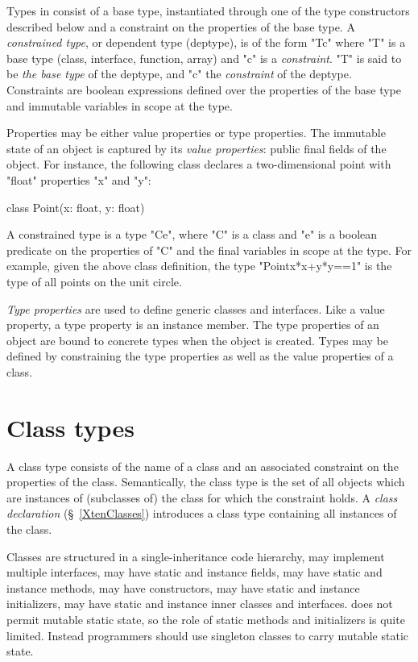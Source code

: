 Types in \Xten{} consist of a base type, instantiated through one of
the type constructors described below and a constraint on the
properties of the base type.
A {\em constrained type}, or dependent type (deptype),
is of the form \xcd"T{c}" where \xcd"T" is a base type (class,
interface, function, array)
and \xcd"c" is a {\em constraint}.  \xcd"T" is said to be 
{\em the base type} of the deptype, and \xcd"c" the {\em constraint}
of the deptype.
Constraints are boolean expressions 
defined over the properties of the base type and immutable
variables in scope at the type.

Properties may be either value properties or type
properties.
The immutable state of an object is captured by its
\emph{value properties}: public final fields of the object.
For instance, the following class declares a two-dimensional
point with \xcd"float" properties \xcd"x" and \xcd"y":
\begin{xten}
class Point(x: float, y: float) { }
\end{xten}
A constrained type is a type \xcd"C{e}", where \xcd"C" is a
class and \xcd"e" is a boolean predicate on the properties of
\xcd"C" and the final variables in scope at the type.
For example, given the above class definition,
the type \xcd"Point{x*x+y*y==1}" is the type of all
points on the unit circle.

{\em Type properties} are used to define generic classes and
interfaces.
Like a value property, a type property is an instance member.
The type properties of an object are bound to concrete types
when the object is
created.
Types may be defined by constraining the type properties as
well as the value properties of a class.


\section{Class types}\label{ReferenceTypes}

A class type consists of the name of a class
and an
associated constraint on the properties of the class.
Semantically, the class type is the set of all objects which are
instances of (subclasses of) the class for which the constraint
holds.
A {\em class declaration} (\S~\ref{XtenClasses})
introduces a class type containing all instances of the class.

Classes are structured in a
single-inheritance code
hierarchy, may implement multiple interfaces, may have static
and
instance fields, may have static and instance methods, may have
constructors, may have static and instance initializers, may
have
static and instance inner classes and interfaces. \Xten{} does
not
permit mutable static state, so the role of static methods and
initializers is quite limited. Instead programmers should use
singleton classes to carry mutable static state.



